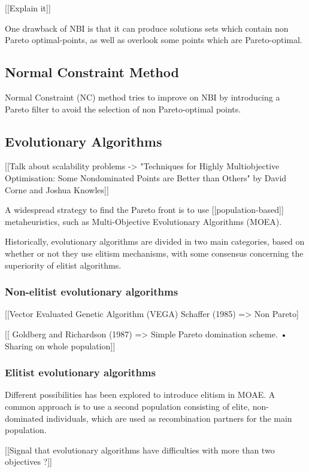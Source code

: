 [[Explain it]]

One drawback of NBI is that it can produce solutions sets which contain non Pareto optimal-points, as well as overlook some points which are Pareto-optimal.

\subsection{Normal Constraint Method}

Normal Constraint (NC) method tries to improve on NBI by introducing a Pareto filter to avoid the selection of non Pareto-optimal points.

\subsection{Evolutionary Algorithms}

[[Talk about scalability problems -> "Techniques for Highly Multiobjective Optimisation: Some Nondominated Points are Better than Others" by David Corne and Joshua Knowles]]


A widespread strategy to find the Pareto front is to use [[population-based]] metaheuristics, such as Multi-Objective Evolutionary Algorithms (MOEA). 

Historically, evolutionary algorithms are divided in two main categories, based on whether or not they use elitism mechanisms, with some consensus concerning the superiority of elitist algorithms.

\subsubsection{Non-elitist evolutionary algorithms}

[[Vector Evaluated Genetic Algorithm (VEGA) Schaffer (1985) => Non Pareto]

[[  Goldberg and Richardson (1987) =>  Simple Pareto domination scheme. • Sharing on whole population]]


\subsubsection{Elitist evolutionary algorithms}

Different possibilities has been explored to introduce elitism in MOAE. A common approach is to use a second population consisting of elite, non-dominated individuals, which are used as recombination partners for the main population.

[[Signal that evolutionary algorithms have difficulties with more than two objectives ?]]

